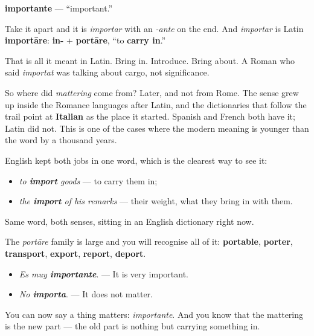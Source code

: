 \begin{cousinweb}
\textbf{importante} — \textquotedblleft{}important.\textquotedblright{}

Take it apart and it is \emph{importar} with an \emph{-ante} on the end. And \emph{importar} is Latin \textbf{importāre}: \textbf{in-} + \textbf{portāre}, \textquotedblleft{}to \textbf{carry in}.\textquotedblright{}

That is all it meant in Latin. Bring in. Introduce. Bring about. A Roman who said \emph{importat} was talking about cargo, not significance.

So where did \emph{mattering} come from? Later, and not from Rome. The sense grew up inside the Romance languages after Latin, and the dictionaries that follow the trail point at \textbf{Italian} as the place it started. Spanish and French both have it; Latin did not. This is one of the cases where the modern meaning is younger than the word by a thousand years.

English kept both jobs in one word, which is the clearest way to see it:

\begin{itemize}
\raggedright
  \item \emph{to \textbf{import} goods} — to carry them in;
  \item \emph{the \textbf{import} of his remarks} — their weight, what they bring in with them.
\end{itemize}

Same word, both senses, sitting in an English dictionary right now.

The \emph{portāre} family is large and you will recognise all of it: \textbf{portable}, \textbf{porter}, \textbf{transport}, \textbf{export}, \textbf{report}, \textbf{deport}.

\begin{itemize}
\raggedright
  \item \emph{Es muy \textbf{importante}}. — It is very important.
  \item \emph{No \textbf{importa}}. — It does not matter.
\end{itemize}
\end{cousinweb}

\begin{grammarlens}[title={What you've built}]
You can now say a thing matters: \emph{importante}. And you know that the mattering is the new part — the old part is nothing but carrying something in.
\end{grammarlens}

